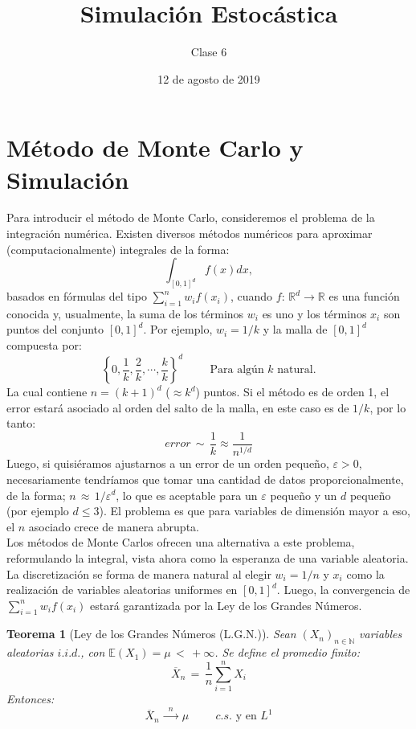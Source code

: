 \documentclass[a4paper]{article}
\title{Simulación Estocástica}
\author{Clase 6}
\date{12 de agosto de 2019}
\newtheorem{teorema}{Teorema}
\numberwithin{equation}{subsection}
\numberwithin{definicion}{subsection}
\def\R{\mathbb R}
\def\N{\mathbb N}
\def\E{\mathbb E}
\begin{document}
\maketitle
\section{Método de Monte Carlo y Simulación}
Para introducir el método de Monte Carlo, consideremos el problema de la integración numérica. Existen diversos métodos numéricos para aproximar (computacionalmente) integrales de la forma:
\[\int_{[0,1]^d}f(x)dx,\]
basados en fórmulas del tipo $\sum_{i=1}^n w_if(x_i)$, cuando $f:\,\R^d\rightarrow\R$ es una función conocida y, usualmente, la suma de los términos $w_i$ es uno y los términos $x_i$ son puntos del conjunto $[0,1]^d$. Por ejemplo, $w_i = 1/k$ y la malla de $[0,1]^d$ compuesta por:
\[\left\{0,\frac{1}{k},\frac{2}{k},\cdots,\frac{k}{k}\right\}^d\hspace{1cm}\text{Para algún $k$ natural.}\]
La cual contiene $n = (k+1)^d$ ($\approx k^d $) puntos. Si el método es de orden 1, el error estará asociado al orden del salto de la malla, en este caso es de $1/k$, por lo tanto:
\[error\,\sim\,\frac{1}{k}\approx \frac{1}{n^{1/d}}\]
Luego, si quisiéramos ajustarnos a un error de un orden pequeño, $\varepsilon > 0$, necesariamente tendríamos que tomar una cantidad de datos proporcionalmente, de la forma; $n\,\approx\,1/\varepsilon^d$, lo que es aceptable para un $\varepsilon$ pequeño y un $d$ pequeño (por ejemplo $d\leq 3$). El problema es que para variables de dimensión mayor a eso, el $n$ asociado crece de manera abrupta. \\Los métodos de Monte Carlos ofrecen una alternativa a este problema, reformulando la integral, vista ahora como la esperanza de una variable aleatoria. La discretización se forma de manera natural al elegir $w_i = 1/n$ y $x_i$ como la realización de variables aleatorias uniformes en $[0,1]^d$. Luego, la convergencia de $\sum_{i=1}^n w_if(x_i)$ estará garantizada por la Ley de los Grandes Números.

\begin{teorema}[Ley de los Grandes Números (L.G.N.)] Sean $(X_n)_{n\in\N}$ variables aleatorias $i.i.d.$, con $\E(X_1)=\mu\,<\,+\infty$. Se define el promedio finito:
\[\overline{X}_n\,=\,\frac{1}{n}\sum_{i=1}^nX_i\]
Entonces:
\[\overline{X}_n\,\xrightarrow{\,\,\,n\,\,\,}\,\mu\hspace{1cm}c.s.\text{ y en }L^1\]
\end{teorema}
\end{document}
